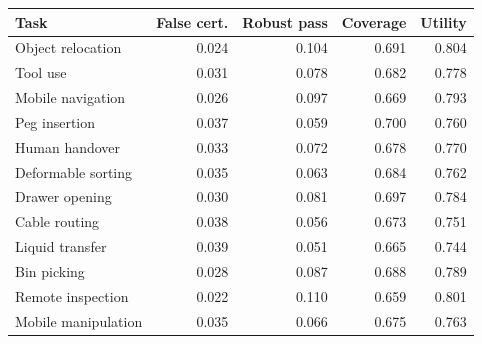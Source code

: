 \begin{tabular}{lrrrr}
\toprule
Task & False cert. & Robust pass & Coverage & Utility \\
\midrule
Object relocation & 0.024 & 0.104 & 0.691 & 0.804 \\
Tool use & 0.031 & 0.078 & 0.682 & 0.778 \\
Mobile navigation & 0.026 & 0.097 & 0.669 & 0.793 \\
Peg insertion & 0.037 & 0.059 & 0.700 & 0.760 \\
Human handover & 0.033 & 0.072 & 0.678 & 0.770 \\
Deformable sorting & 0.035 & 0.063 & 0.684 & 0.762 \\
Drawer opening & 0.030 & 0.081 & 0.697 & 0.784 \\
Cable routing & 0.038 & 0.056 & 0.673 & 0.751 \\
Liquid transfer & 0.039 & 0.051 & 0.665 & 0.744 \\
Bin picking & 0.028 & 0.087 & 0.688 & 0.789 \\
Remote inspection & 0.022 & 0.110 & 0.659 & 0.801 \\
Mobile manipulation & 0.035 & 0.066 & 0.675 & 0.763 \\
\bottomrule
\end{tabular}
